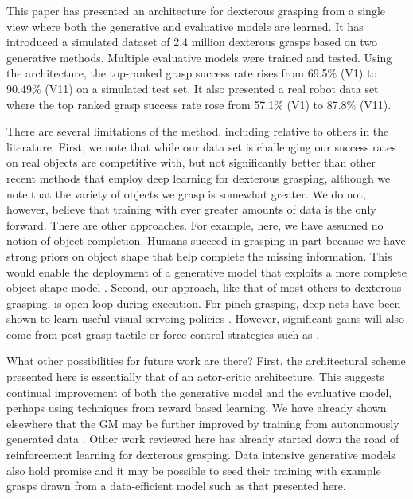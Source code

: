This paper has presented an architecture for dexterous grasping from a single view where both the generative and evaluative models are learned. It has introduced a simulated dataset of 2.4 million dexterous grasps based on two generative methods. Multiple evaluative models were trained and tested. Using the architecture, the top-ranked grasp success rate  rises from 69.5\% (V1) to 90.49\% (V11) on a simulated test set. It also presented a real robot data set where the top ranked grasp success rate rose from 57.1\% (V1) to 87.8\% (V11).

There are several limitations of the method, including relative to others in the literature. First, we note that while our data set is challenging our success rates on real objects are competitive with, but not significantly better than other recent methods that employ deep learning for dexterous grasping, although we note that the variety of objects we grasp is somewhat greater. We do not, however, believe that training with ever greater amounts of data is the only forward. There are other approaches. For example, here, we have assumed no notion of object completion. Humans succeed in grasping in part because we have strong priors on object shape that help complete the missing information. This would enable the deployment of a generative model that exploits a more complete object shape model \cite{kopicki2015ijrr}. Second, our approach, like that of most others to dexterous grasping, is open-loop during execution. For pinch-grasping, deep nets have been shown to learn useful visual servoing policies \cite{morrison18}. However, significant gains will also come from post-grasp tactile or force-control strategies such as \cite{Torres2018}.

What other possibilities for future work are there? First, the architectural scheme presented here is essentially that of an actor-critic architecture. This suggests continual improvement of both the generative model and the evaluative model, perhaps using techniques from reward based learning. We have already shown elsewhere that the GM may be further improved by training from autonomously generated data \cite{kopicki2019ijrr}. Other work reviewed here \cite{mandikal2021dexterous,Osa2018} has already started down the road of reinforcement learning for dexterous grasping. Data intensive generative models also hold promise \cite{veres2017modeling,Shao2020,Shang2020,Zhao2020} and it may be possible to seed their training with example grasps drawn from a data-efficient model such as that presented here.\\